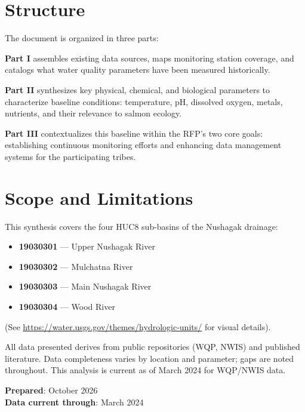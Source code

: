 \documentclass[
  letterpaper,
]{scrbook}
\providecommand{\tightlist}{%
  \setlength{\itemsep}{0pt}\setlength{\parskip}{0pt}}\usepackage{longtable,booktabs,array}
\begin{document}
\section*{Structure}\label{structure}


The document is organized in three parts:

\textbf{Part I} assembles existing data sources, maps monitoring station
coverage, and catalogs what water quality parameters have been measured
historically.

\textbf{Part II} synthesizes key physical, chemical, and biological
parameters to characterize baseline conditions: temperature, pH,
dissolved oxygen, metals, nutrients, and their relevance to salmon
ecology.

\textbf{Part III} contextualizes this baseline within the RFP's two core
goals: establishing continuous monitoring efforts and enhancing data
management systems for the participating tribes.

\section*{Scope and Limitations}\label{scope-and-limitations}


This synthesis covers the four HUC8 sub-basins of the Nushagak drainage:

\begin{itemize}
\tightlist
\item
  \textbf{19030301} --- Upper Nushagak River
\item
  \textbf{19030302} --- Mulchatna River
\item
  \textbf{19030303} --- Main Nushagak River
\item
  \textbf{19030304} --- Wood River
\end{itemize}

(See \url{https://water.usgs.gov/themes/hydrologic-units/} for visual
details).

All data presented derives from public repositories (WQP, NWIS) and
published literature. Data completeness varies by location and
parameter; gaps are noted throughout. This analysis is current as of
March 2024 for WQP/NWIS data.

\textbf{Prepared}: October 2026\\
\textbf{Data current through}: March 2024
\end{document}
